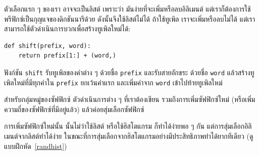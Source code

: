 
ตัวเลือกแรก ๆ ของเรา อาจจะเป็นลิสต์
เพราะว่า มันง่ายที่จะเพิ่มหรือลบอิลิเมนต์
แต่เราก็ต้องการใช้พรีฟิกซ์เป็นกุญแจของดิกชันนารีด้วย
ดังนั้นจึงใช้ลิสต์ไม่ได้
ถ้าใช้ทูเพิล เราจะเพิ่มหรือลบไม่ได้ แต่เราสามารถใช้ตัวดำเนินการบวกเพื่อสร้างทูเพิลใหม่ได้:

\begin{verbatim}
def shift(prefix, word):
    return prefix[1:] + (word,)
\end{verbatim}
%
%
ฟังก์ชัน \texttt{shift} รับทูเพิลของคำต่าง ๆ ด้วยชื่อ \texttt{prefix}
และรับสายอักขระ ด้วยชื่อ \texttt{word}
แล้วสร้างทูเพิลใหม่ที่มีทุกคำใน \texttt{prefix} ยกเว้นคำแรก
และเพิ่มคำจาก \texttt{word} เข้าไปท้ายทูเพิลใหม่


สำหรับกลุ่มหมู่ของซัฟฟิกซ์
ตัวดำเนินการต่าง ๆ ที่เราต้องเขียน รวมถึงการเพิ่มซัฟฟิกซ์ใหม่
(หรือเพิ่มความถี่ของซัฟฟิกซ์ที่มีอยู่แล้ว)
แล้วค่อยสุ่มเลือกซัฟฟิกซ์


การเพิ่มซัฟฟิกซ์ใหม่นั้น นั้นไม่ว่าใช้ลิสต์ หรือใช้ฮิสโตแกรม ก็ทำได้ง่ายพอ ๆ กัน
แต่การสุ่มเลือกอิลิเมนต์จากลิสต์ทำได้ง่าย
ในขณะที่การสุ่มเลือกจากฮิสโตแกรมอย่างมีประสิทธิภาพทำได้ยากทีเดียว
(ดูแบบฝึกหัด~\ref{randhist})


